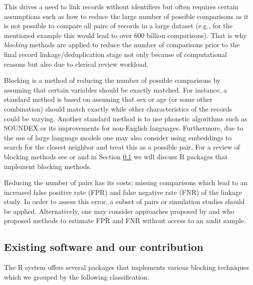 This drives a need to link records without identifiers but often requires certain assumptions such as how to reduce the large number of possible comparisons as it is not possible to compare all pairs of records in a large dataset (e.g., for the mentioned example this would lead to over 600 billion comparisons). That is why \emph{blocking} methods are applied to reduce the number of comparisons prior to the final record linkage/deduplication stage not only because of computational reasons but also due to clerical review workload.

Blocking is a method of reducing the number of possible comparisons by assuming that certain variables should be exactly matched. For instance, a standard method is based on assuming that sex or age (or some other combination) should match exactly while other characteristics of the records could be varying. Another standard method is to use phonetic algorithms such as SOUNDEX or its improvements for non-English languages. Furthermore, due to the use of large language models one may also consider using embeddings to search for the closest neighbor and treat this as a possible pair. For a review of blocking methods see \citet{Steorts2014} or \citet{Papadakis2020} and in Section \ref{sec-software} we will discuss R packages that implement blocking methods.

Reducing the number of pairs has its costs: missing comparisons which lead to an increased false positive rate (FPR) and false negative rate (FNR) of the linkage study. In order to assess this error, a subset of pairs or simulation studies should be applied. Alternatively, one may consider approaches proposed by \citet{dasylva2021estimating} and \citet{dasylva2022consistent} who proposed methods to estimate FPR and FNR without access to an audit sample.

\subsection{Existing software and our contribution}\label{sec-software}

The R system offers several packages that implements various blocking techniques which we grouped by the following classification:

